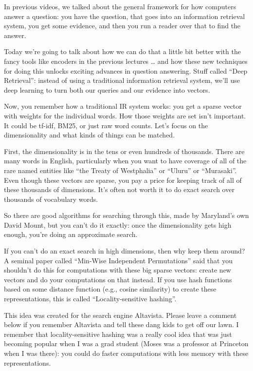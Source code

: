 



In previous videos, we talked about the general framework for how computers answer a question: you have the question, that goes into an information retrieval system, you get some evidence, and then you run a reader over that to find the answer.

Today we’re going to talk about how we can do that a little bit better with the fancy tools like encoders in the previous lectures … and how these new techniques for doing this unlocks exciting advances in question answering.  Stuff called “Deep Retrieval”: instead of using a traditional information retrieval system, we’ll use deep learning to turn both our queries and our evidence into vectors.

Now, you remember how a traditional IR system works: you get a sparse vector with weights for the individual words.  How those weights are set isn’t important.  It could be tf-idf, BM25, or just raw word counts.  Let’s focus on the dimensionality and what kinds of things can be matched.

First, the dimensionality is in the tens or even hundreds of thousands.  There are many words in English, particularly when you want to have coverage of all of the rare named entities like “the Treaty of Westphalia” or “Uluru” or “Murasaki”.  Even though these vectors are sparse, you pay a price for keeping track of all of these thousands of dimensions.  It’s often not worth it to do exact search over thousands of vocabulary words.  

So there are good algorithms for searching through this, made by Maryland’s own David Mount, but you can’t do it exactly: once the dimensionality gets high enough, you’re doing an approximate search.  

If you can’t do an exact search in high dimensions, then why keep them around?  A seminal paper called “Min-Wise Independent Permutations” said that you shouldn't do this for computations with these big sparse vectors: create new vectors and do your computations on that instead.  If you use hash functions based on some distance function (e.g., cosine similarity) to create these representations, this is called “Locality-sensitive hashing”.  

This idea was created for the search engine Altavista.  Please leave a comment below if you remember Altavista and tell these dang kids to get off our lawn.  I remember that locality-sensitive hashing was a really cool idea that was just becoming popular when I was a grad student (Moses was a professor at Princeton when I was there): you could do faster computations with less memory with these representations.

